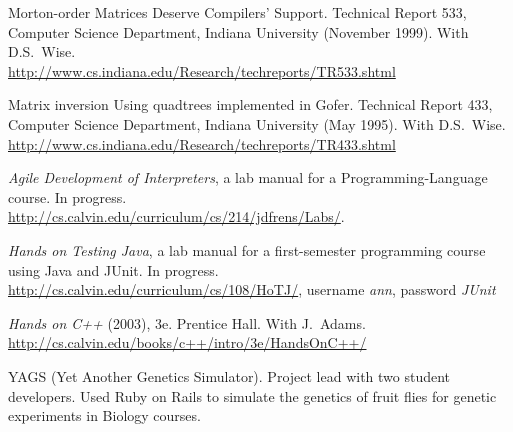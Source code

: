 \documentclass[ComputerScience]{vita}
\newcommand{\duphref}[1]{\href{#1}{#1}}
\begin{document}
\begin{vita}
\begin{Publications}
\begin{Papers at Refereed Conferences}
  \end{Papers at Refereed Conferences}

  \begin{Technical Reports}

  \item Morton-order Matrices Deserve Compilers' Support. Technical Report 533, Computer Science Department, Indiana University (November 1999).  With D.S.~Wise.  \\\duphref{http://www.cs.indiana.edu/Research/techreports/TR533.shtml}

  \item Matrix inversion Using quadtrees implemented in Gofer.  Technical Report 433, Computer Science Department, Indiana University (May 1995).  With D.S.~Wise.  \\\duphref{http://www.cs.indiana.edu/Research/techreports/TR433.shtml}

  \end{Technical Reports}

  \begin{labmanuals}
  
  \item \textit{Agile Development of Interpreters}, a lab manual for a Programming-Language course.  In progress.  \\\duphref{http://cs.calvin.edu/curriculum/cs/214/jdfrens/Labs/}.
  
  \item \textit{Hands on Testing Java}, a lab manual for a first-semester programming course using Java and JUnit.  In progress.  \\\duphref{http://cs.calvin.edu/curriculum/cs/108/HoTJ/}, username \emph{ann}, password \emph{JUnit}

  \item \textit{Hands on C++} (2003), 3e.  Prentice Hall.  With J.\ Adams.  \\\duphref{http://cs.calvin.edu/books/c++/intro/3e/HandsOnC++/}

  \end{labmanuals}

\end{Publications}

\begin{software}
  \item YAGS (Yet Another Genetics Simulator).  Project lead with two student developers.  Used Ruby on Rails to simulate the genetics of fruit flies for genetic experiments in Biology courses.
  

\end{software}
\end{vita}
\end{document}
